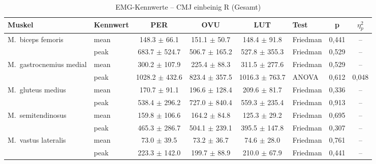 \begin{table}[H]
  \centering
  \caption{EMG-Kennwerte – CMJ einbeinig R (Gesamt)}
  \label{tab:CMJ_einbeinig_R_Gesamt}
  \small
  \begin{tabular}{l l c c c l c c}
    \hline
    \textbf{Muskel} & \textbf{Kennwert} & \textbf{PER} & \textbf{OVU} & \textbf{LUT} & \textbf{Test} & \textbf{p} & \textbf{$\eta^2_p$} \\
    \hline
    M.~biceps femoris & mean & 148.3 $\pm$ 66.1 & 151.1 $\pm$ 50.7 & 148.4 $\pm$ 91.8 & Friedman & 0{,}441 & -- \\
     & peak & 683.7 $\pm$ 524.7 & 506.7 $\pm$ 165.2 & 527.8 $\pm$ 355.3 & Friedman & 0{,}529 & -- \\
    \hline
    M.~gastrocnemius medial & mean & 300.2 $\pm$ 107.9 & 225.4 $\pm$ 88.3 & 311.5 $\pm$ 277.6 & Friedman & 0{,}529 & -- \\
     & peak & 1028.2 $\pm$ 432.6 & 823.4 $\pm$ 357.5 & 1016.3 $\pm$ 763.7 & ANOVA & 0{,}612 & 0{,}048 \\
    \hline
    M.~gluteus medius & mean & 170.7 $\pm$ 91.1 & 196.6 $\pm$ 128.4 & 209.6 $\pm$ 81.7 & Friedman & 0{,}336 & -- \\
     & peak & 538.4 $\pm$ 296.2 & 727.0 $\pm$ 840.4 & 559.3 $\pm$ 235.4 & Friedman & 0{,}913 & -- \\
    \hline
    M.~semitendinosus & mean & 159.8 $\pm$ 106.6 & 164.2 $\pm$ 84.8 & 125.3 $\pm$ 29.2 & Friedman & 0{,}695 & -- \\
     & peak & 465.3 $\pm$ 286.7 & 504.1 $\pm$ 239.1 & 395.5 $\pm$ 147.8 & Friedman & 0{,}307 & -- \\
    \hline
    M.~vastus lateralis & mean & 73.0 $\pm$ 39.5 & 73.2 $\pm$ 36.7 & 74.6 $\pm$ 28.0 & Friedman & 0{,}761 & -- \\
     & peak & 223.3 $\pm$ 142.0 & 199.7 $\pm$ 88.9 & 210.0 $\pm$ 67.9 & Friedman & 0{,}441 & -- \\
    \hline
  \end{tabular}
\end{table}

